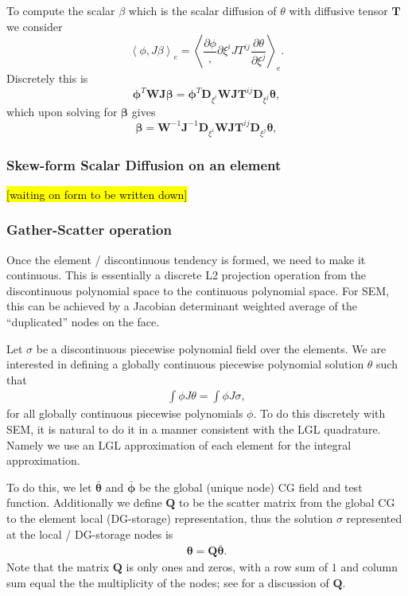 \documentclass{report}
\newcommand{\inner}[2]{ \left\langle #1, #2 \right\rangle }
\newcommand{\mat}[1]{\boldsymbol #1}
\newcommand{\dvec}[1]{\boldsymbol #1}
\begin{document}
To compute the scalar $\beta$ which is the scalar diffusion of $\theta$
with diffusive tensor $\mat{T}$ we consider
\begin{equation}
  \inner{\phi}{J\beta}_{e}
  =
  \inner{\frac{\partial \phi}}{{\partial \xi^{i}}{J T^{ij} \frac{\partial\theta}{\partial \xi^j}}}_{e}.
\end{equation}
Discretely this is
\begin{equation}
  \dvec{\phi}^{T} \mat{W} \mat{J} \dvec{\beta}
  =
  \dvec{\phi}^{T} \mat{D}_{\xi^{i}} \mat{W} \mat{J} \mat{T}^{ij} \mat{D}_{\xi^{j}}\dvec{\theta},
\end{equation}
which upon solving for $\dvec{\beta}$ gives
\begin{equation}
  \dvec{\beta}
  =
  \mat{W}^{-1} \mat{J}^{-1} \mat{D}_{\xi^{i}} \mat{W} \mat{J} \mat{T}^{ij} \mat{D}_{\xi^{j}}\dvec{\theta},
\end{equation}

\subsubsection*{Skew-form Scalar Diffusion on an element}

\hl{[waiting on form to be written down]}

\subsubsection*{Gather-Scatter operation}
Once the element / discontinuous tendency is formed, we need to make it continuous.
This is essentially a discrete L2 projection operation from the discontinuous polynomial space
to the continuous polynomial space. For SEM, this can be achieved by a Jacobian determinant
weighted average of the ``duplicated'' nodes on the face.

Let $\sigma$ be a discontinuous piecewise polynomial field over the elements.
We are interested in defining a globally continuous piecewise polynomial solution $\theta$
such that
\begin{align}
  \int \phi J \theta = \int \phi J \sigma,
\end{align}
for all globally continuous piecewise polynomials $\phi$.
To do this discretely with SEM, it is natural to do it in a manner consistent with the LGL quadrature.
Namely we use an LGL approximation of each element for the integral approximation.

To do this, we let
$\bar{\dvec{\theta}}$ and $\bar{\dvec{\phi}}$
be the
global (unique node) CG field and test function. Additionally we define $\mat{Q}$ to be the scatter matrix
from the global CG to the element local (DG-storage) representation, thus the
solution $\sigma$ represented at the local / DG-storage nodes is
\begin{align}
    \label{eqn:DGCGProj}
    \dvec{\theta} = \mat{Q} \bar{\dvec{\theta}}.
\end{align}
Note that the matrix $\mat{Q}$ is only ones and zeros, with a row sum of $1$ and
column sum equal the the multiplicity of the nodes;
see \citet[page 192ff]{deville_fischer_mund_2002} for a discussion of $\mat{Q}$.
\end{document}
